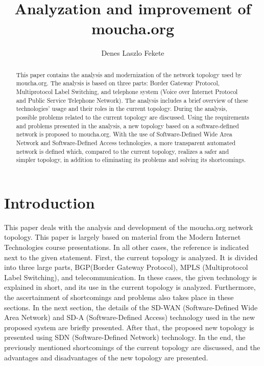 \documentclass{article}
\title{Analyzation and improvement of moucha.org}
\author{Denes Laszlo Fekete}
\begin{document}
\maketitle

\begin{abstract}
This paper contains the analysis and modernization of the network topology used by moucha.org. The analysis is based on three parts: Border Gateway Protocol, Multiprotocol Label Switching, and telephone system (Voice over Internet Protocol and Public Service Telephone Network). The analysis includes a brief overview of these technologies' usage and their roles in the current topology. During the analysis, possible problems related to the current topology are discussed. Using the requirements and problems presented in the analysis, a new topology based on a software-defined network is proposed to moucha.org. With the use of Software-Defined Wide Area Network and Software-Defined Access technologies, a more transparent automated network is defined which, compared to the current topology, realizes a safer and simpler topology, in addition to eliminating its problems and solving its shortcomings.
\end{abstract}

\section{Introduction}
This paper deals with the analysis and development of the moucha.org network topology. This paper is largely based on material from the Modern Internet Technologies course presentations\cite{MTI1}\cite{MTI2}. In all other cases, the reference is indicated next to the given statement. First, the current topology is analyzed. It is divided into three large parts, BGP(Border Gateway Protocol), MPLS (Multiprotocol Label Switching), and telecommunication. In these cases, the given technology is explained in short, and its use in the current topology is analyzed. Furthermore, the ascertainment of shortcomings and problems also takes place in these sections. In the next section, the details of the SD-WAN (Software-Defined Wide Area Network) and SD-A (Software-Defined Access) technology used in the new proposed system are briefly presented. After that, the proposed new topology is presented using SDN (Software-Defined Network) technology.
In the end, the previously mentioned shortcomings of the current topology are discussed, and the advantages and disadvantages of the new topology are presented.
\end{document}
